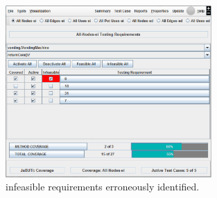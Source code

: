 
\begin{figure}[!ht]
\begin{center}
\includegraphics[width=0.70\textwidth]{fig/required-elements-covered-infeasible.eps}
\caption{\label{fig:covered-infeasible} 
infeasible requirements erroneously identified.}
\end{center}
\end{figure}
